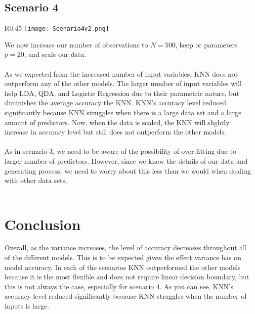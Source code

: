 \documentclass[11pt, oneside]{article}
\begin{document}
\pagebreak
\subsection*{Scenario 4}
\begin{wrapfigure}[]{R}{0.45\textwidth}
\vspace{-0.55cm}
\texttt{[image: Scenario4v2.png]}
\vspace{-.55cm}
\end{wrapfigure}

We now increase our number of observations to $N=500$, keep or parameters $p=20$, and scale our data.\\
\\
As we expected from the increased number of input variables, KNN does not outperform any of the other models. The larger number of input variables will help LDA, QDA, and Logistic Regression due to their parametric nature, but diminishes the average accuracy the KNN. KNN’s accuracy level reduced significantly because KNN struggles when there is a large data set and a large amount of predictors. Now, when the data is scaled, the KNN will slightly increase in accuracy level but still does not outperform the other models.\\
\\
As in scenario 3, we need to be aware of the possibility of over-fitting due to larger number of predictors. However, since we know the details of our data and generating process, we need to worry about this less than we would when dealing with other data sets.\\
\\







\section*{Conclusion}

Overall, as the variance increases, the level of accuracy decreases throughout all of the different models. This is to be expected given the effect variance has on model accuracy. In each of the scenarios KNN outperformed the other models because it is the most flexible and does not require linear decision boundary, but this is not always the case, especially for scenario 4. As you can see, KNN’s accuracy level reduced significantly because KNN struggles when the number of inputs is large.\\
\\
\\
\end{document}
